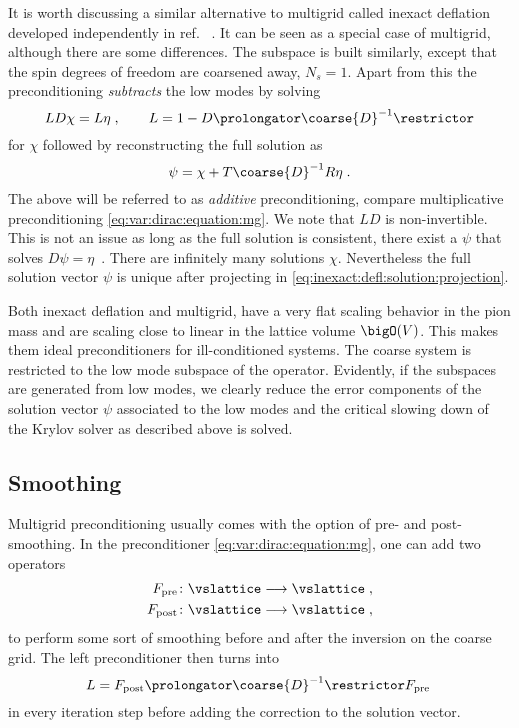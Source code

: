 It is worth discussing a similar alternative to multigrid called inexact deflation developed independently in ref. ~\cite{Luescher2007}.
It can be seen as a special case of multigrid, although there are some differences.
The subspace is built similarly, except that the spin degrees of freedom are coarsened away, $N_s = 1$.
Apart from this the preconditioning \emph{subtracts} the low modes by solving
\begin{equation} \label{eq:var:dirac:equation:inexact:defl}
L D \chi = L \eta \;,
\qquad
L = 1 - D \prolongator \coarse{D}^{-1} \restrictor
\end{equation}
for $\chi$ followed by reconstructing the full solution as
\begin{equation} \label{eq:inexact:defl:solution:projection}
\psi = \chi + T \coarse{D}^{-1} R \eta \;.
\end{equation}
The above will be referred to as \emph{additive} preconditioning, compare multiplicative preconditioning \cref{eq:var:dirac:equation:mg}.
We note that $L D$ is non-invertible.
This is not an issue as long as the full solution is consistent, \ie there exist a $\psi$ that solves $D \psi = \eta$~\cite{kaasschieter1988preconditioned}.
There are infinitely many solutions $\chi$.
Nevertheless the full solution vector $\psi$ is unique after projecting in \cref{eq:inexact:defl:solution:projection}.

Both inexact deflation and multigrid, have a very flat scaling behavior in the pion mass and are scaling close to linear in the lattice volume $\bigO(V)$.
This makes them ideal preconditioners for ill-conditioned systems.
The coarse system is restricted to the low mode subspace of the operator.
Evidently, if the subspaces are generated from low modes, we clearly reduce the error components of the solution vector $\psi$ associated to the low modes and the critical slowing down of the Krylov solver as described above is solved.

\subsection{Smoothing}

Multigrid preconditioning usually comes with the option of pre- and post-smoothing.
In the preconditioner \cref{eq:var:dirac:equation:mg}, one can add two operators
\begin{align}
F_{\text{pre}}  &\colon \vslattice \longrightarrow \vslattice \;, \\
F_{\text{post}} &\colon \vslattice \longrightarrow \vslattice \;,
\end{align}
to perform some sort of smoothing before and after the inversion on the coarse grid.
The left preconditioner then turns into
\begin{equation}
L = F_{\text{post}} \prolongator \coarse{D}^{-1} \restrictor F_{\text{pre}} \;
\end{equation}
in every iteration step before adding the correction to the solution vector.

